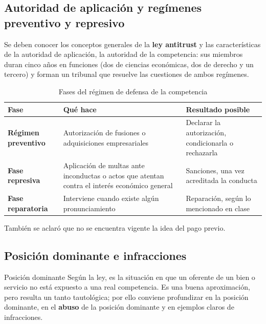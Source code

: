 \documentclass[12pt,oneside]{book}
\begin{document}
\subsection{Autoridad de aplicación y regímenes preventivo y represivo}

Se deben conocer los conceptos generales de la \textbf{ley antitrust} y las características de la autoridad de aplicación, la autoridad de la competencia: sus miembros duran cinco años en funciones (dos de ciencias económicas, dos de derecho y un tercero) y forman un tribunal que resuelve las cuestiones de ambos regímenes.

\begin{table}[H]
\centering
\renewcommand{\arraystretch}{1.3}
\begin{tabularx}{\textwidth}{
    >{\raggedright\arraybackslash}p{}
    >{\raggedright\arraybackslash}X
    >{\raggedright\arraybackslash}X
}
\toprule
\textbf{Fase} & \textbf{Qué hace} & \textbf{Resultado posible} \\
\midrule
\textbf{Régimen preventivo} & Autorización de fusiones o adquisiciones empresariales & Declarar la autorización, condicionarla o rechazarla \\
\textbf{Fase represiva} & Aplicación de multas ante inconductas o actos que atentan contra el interés económico general & Sanciones, una vez acreditada la conducta \\
\textbf{Fase reparatoria} & Interviene cuando existe algún pronunciamiento & Reparación, según lo mencionado en clase \\
\bottomrule
\end{tabularx}
\caption{Fases del régimen de defensa de la competencia}
\end{table}

También se aclaró que no se encuentra vigente la idea del pago previo.

\subsection{Posición dominante e infracciones}

\begin{definition}{Posición dominante}
Según la ley, es la situación en que un oferente de un bien o servicio no está expuesto a una real competencia. Es una buena aproximación, pero resulta un tanto tautológica; por ello conviene profundizar en la posición dominante, en el \textbf{abuso} de la posición dominante y en ejemplos claros de infracciones.
\end{definition}
\end{document}
